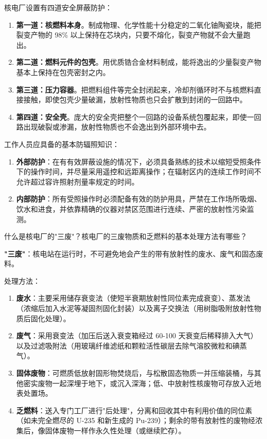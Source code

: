 \begin{solution}
核电厂设置有四道安全屏蔽防护：
\begin{enumerate}
  \item \textbf{第一道：核燃料本身}。制成物理、化学性能十分稳定的二氧化铀陶瓷块，能把裂变产物的 98\% 以上保持在芯块内，只要不熔化，裂变产物就不会大量跑出。
  \item \textbf{第二道：燃料元件的包壳}。用优质锆合金材料制成，能将逸出的少量裂变产物基本上保持在包壳密封之内。
  \item \textbf{第三道：压力容器}。把燃料组件等完全封闭起来，冷却剂循环时不与核燃料直接接触，即使包壳少量破漏，放射性物质也只会扩散到封闭的一回路中。
  \item \textbf{第四道：安全壳}。庞大的安全壳把整个一回路的设备系统包覆起来，即使一回路出现破裂或渗漏，放射性物质也不会逸出到外部环境中去。
\end{enumerate}

工作人员应具备的基本防辐照知识：
\begin{enumerate}
  \item \textbf{外部防护}：在有有效屏蔽设施的情况下，必须具备熟练的技术以缩短受照条件下的操作时间，并尽量采用遥控和远距离操作；在辐射区内的连续工作时间不允许超过容许照射剂量率规定的时间。
  \item \textbf{内部防护}：所有受照操作时必须配备有效的防护用具，严禁在工作场所吸烟、饮水和进食，并依靠精确的仪器对禁区范围进行连续、严密的放射性污染监测。
\end{enumerate}
\end{solution}

\begin{problem}
什么是核电厂的"三废"？核电厂的三废物质和乏燃料的基本处理方法有哪些？
\end{problem}

\begin{solution}
\textbf{"三废"}：核电站在运行时，不可避免地会产生的带有放射性的废水、废气和固态废料。

处理方法：
\begin{enumerate}
  \item \textbf{废水}：主要采用储存衰变法（使短半衰期放射性同位素完成衰变）、蒸发法（浓缩后加入水泥等凝固剂固化封装）以及离子交换法（用树脂吸附放射性物质后固化处理）。
  \item \textbf{废气}：采用衰变法（加压后送入衰变箱经过 60-100 天衰变后稀释排入大气）以及过滤吸附法（用玻璃纤维滤纸和颗粒活性碳层去除气溶胶微粒和碘蒸气）。
  \item \textbf{固体废物}：可燃质低放射固形物焚烧后，与松散固态物质一并压缩装桶，与其他密实废物一起深埋于地下，或沉入深海；低、中放射性核废物可存放入近地表处置场。
  \item \textbf{乏燃料}：送入专门工厂进行"后处理"，分离和回收其中有利用价值的同位素（如未完全燃尽的 U-235 和新生成的 Pu-239）；剩余的带有放射性的废物经浓集后，像固体废物一样作永久性处理（或继续贮存）。
\end{enumerate}
\end{solution}
